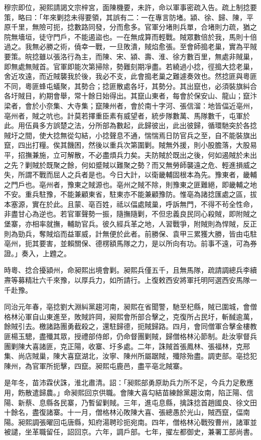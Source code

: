 \begin{pinyinscope}
穆宗即位，昶熙請謁文宗梓宮，面陳機要，未許，命以軍事密疏入告。疏上制捻要策，略曰：「年來剿捻未得要領，其誤有二：一在專言防堵。潁、徐、歸、陳，平原千里，無險可扼，捻數路同發，分而愈多。官軍分堵則兵單，合堵則力疏，猶之院無墻垣，徒守門戶，不能遏盜也。一在無成算而輕戰。賊眾數倍於我，馬則十倍過之。我無必勝之術，僥幸一戰，一旦敗潰，賊焰愈張。至會師搗老巢，實為平賊要策。皖捻雖以張洛行為主，而陳、宋、潁、壽、淮、徐方數百里，無處非賊巢，即無處無賊首。官軍即能次第掃除，勢難刻期凈盡。若繞過小捻，徑搗大捻老巢，舍近攻遠，而近賊襲我於後，我必不支，此會搗老巢之難遽奏效也。然捻匪與粵匪不同，粵匪蜂屯蟻聚，其勢合；捻匪散處各圩，其勢分。其出竄也，必須裝旗糾合各圩賊目，約期會舉，常十餘日始得出。其竄山東者，每會於保安山、龍山；竄汴梁者，會於小奈集、大寺集；竄陳州者，會於南十字河、張信溜：地皆偪近亳州，亳州者，賊之吭也。計莫若擇重臣素有威望者，統步隊數萬、馬隊數千，屯軍於此。用伍員多方誤楚之法，分所部為數起，此歸彼出，此出彼歸，循環馳突於各捻賊圩之間，使大捻無從勾結，小捻聲息不通，惴惴焉日防官兵之至，自不能裝旗出竄，四出打糧。俟其饑困，然後以重兵次第圍剿。賊無外援，則小股膽落，大股易平，招撫兼施，立可解散，不必盡煩兵力矣。夫防賊於既出之後，何如遏賊於未出之先？剿賊於既聚之餘，何如蹙賊以難聚之勢？而又無勞師襲遠之危、輕進損威之失，所謂不戰而屈人之兵者是也。今日大計，以衛畿輔固根本為先。豫東者，畿輔之門戶也。亳州者，豫東之賊源也。亳州之賊不除，則豫東之匪難絕，即畿輔之地不安。重兵駐豫，不能兼顧東省，駐東亦不能兼顧豫防。惟亳為諸捻匯處之區，拔本塞源，實在於此。且蒙、亳百姓，祗以偪處賊巢，呼訴無門，不得不茍全性命，非盡甘心為逆也。若官軍聲勢一振，隨撫隨剿，不但忠義良民同心殺賊，即附賊之堡寨，亦相率就撫，輔助官兵。彼久經兵革之地，人習戰爭，附賊則為悍賊，反正則為勁兵，奪賊焰而益軍威，計無便於此者。前勝保、袁甲三累獲大勝，皆由屯駐亳州，扼其要害，並賴關保、德楞額馬隊之力，是以所向有功。前事不遠，可為券證。」奏入，上韙之。

時粵、捻合擾潁州，命昶熙出境會剿。昶熙兵僅五千，且無馬隊，疏請調總兵李續燾等募精壯六千來豫，以厚兵力，如所請行。上復敕西安將軍托明阿選西安馬隊一千赴豫。

同治元年春，亳捻劉大淵糾黨趨河南，昶熙在省聞警，馳至杞縣，賊已圍城，會僧格林沁軍自山東進至，敗賊許岡，昶熙會所部合擊之，克復所占民圩，斬馘逾萬，餘賊引去。檄諸路團勇截殺之，還駐歸德，扼賊歸路。四月，會同僧軍合擊金樓教匪楊玉驄，盡殲其眾，授禮部侍郎，仍命督團剿賊，歸僧格林沁節制。赴汝寧督兵團剿陳大喜諸匪，克正陽，收寨、圩多處。二年，誅賊首張鳳林、張福林，克邢集、尚店賊巢，陳大喜竄湖北，汝寧、陳州所屬踞賊，殲除殆盡。調吏部。亳捻犯陳州，為官軍所扼擊，四竄。昶熙屯鹿邑，盡平亳北賊寨。

是年冬，苗沛霖伏誅，淮北肅清。詔：「昶熙部勇原助兵力所不足，今兵力足敷應用，飭散遣歸農。」命昶熙回京供職。會陳大喜勾結苗練餘黨趨汝南，陷正陽、信陽、新蔡、息縣各民寨，乃暫留剿賊。三年，進屯息縣，擒誅捻首趙國良、徐文田十餘名，盡復諸寨。十一月，僧格林沁敗陳大喜、張總愚於光山，賊西竄，偪南陽。昶熙調張曜回屯唐縣，知府湯聘珍扼宛南。四年，僧格林沁戰歿曹州，諸軍並被譴，坐革職留任，詔回京。六年，調戶部。七年，擢左都御史，兼署工部尚書。


\end{pinyinscope}
